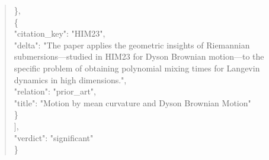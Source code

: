 \documentclass[11pt]{article}
\begin{document}
\begin{quote}
    \},\\
    \{\\
      "citation\_key": "HIM23",\\
      "delta": "The paper applies the geometric insights of Riemannian submersions---studied in HIM23 for Dyson Brownian motion---to the specific problem of obtaining polynomial mixing times for Langevin dynamics in high dimensions.",\\
      "relation": "prior\_art",\\
      "title": "Motion by mean curvature and Dyson Brownian Motion"\\
    \}\\
  ],\\
  "verdict": "significant"\\
\}\\
\end{quote}
\end{document}
